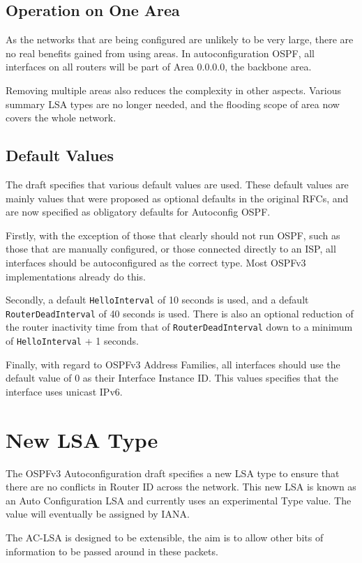 \documentclass[12pt]{report}
\begin{document}
\subsection{Operation on One Area}
As the networks that are being configured are unlikely to be very large, there
are no real benefits gained from using areas. In autoconfiguration OSPF, all
interfaces on all routers will be part of Area 0.0.0.0, the backbone area.

Removing multiple areas also reduces the complexity in other aspects. Various
summary LSA types are no longer needed, and the flooding scope of area now
covers the whole network.

\subsection{Default Values}
The draft specifies that various default values are used. These default values
are mainly values that were proposed as optional defaults in the original RFCs,
and are now specified as obligatory defaults for Autoconfig OSPF\@. 

Firstly, with the exception of those that clearly should not run OSPF, such as
those that are manually configured, or those connected directly to an ISP, all
interfaces should be autoconfigured as the correct type. Most OSPFv3
implementations already do this. 

Secondly, a default \texttt{HelloInterval} of 10 seconds is used, and a default
\texttt{RouterDeadInterval} of 40 seconds is used. There is also an optional
reduction of the router inactivity time from that of
\texttt{RouterDeadInterval} down to a minimum of \texttt{HelloInterval} + 1
seconds. 

Finally, with regard to OSPFv3 Address Families, all interfaces should use the
default value of 0 as their Interface Instance ID\@. This values specifies that
the interface uses unicast IPv6.  

\section{New LSA Type}
The OSPFv3 Autoconfiguration draft specifies a new LSA type to ensure that
there are no conflicts in Router ID across the network. This new LSA is known
as an Auto Configuration LSA and currently uses an experimental Type value. The
value will eventually be assigned by IANA\@. 

The AC-LSA is designed to be extensible, the aim is to allow other bits of
information to be passed around in these packets. 
\end{document}

